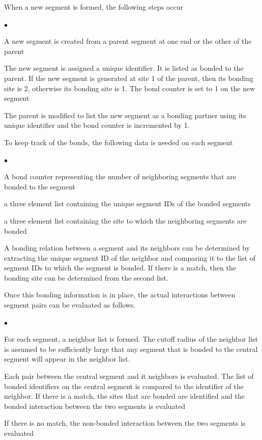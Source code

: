 \documentclass[12pt]{article}
\begin{document}
When a new segment is formed, the following steps occur
\begin{list}{$\bullet$}{}
\item A new segment is created from a parent segment at one end or the other of
the parent
\item The new segment is assigned a unique identifier. It is listed as bonded to
the parent. If the new segment is generated at site 1 of the parent, then its
bonding site is 2, otherwise its bonding site is 1. The bond counter is set to 1
on the new segment
\item The parent is modified to list the new segment as a bonding partner using
its unique identifier and the bond counter is incremented by 1.
\end{list}

To keep track of the bonds, the following data is needed on each segment
\begin{list}{$\bullet$}{}
\item A bond counter representing the number of neighboring segments that are bonded
to the segment
\item a three element list containing the unique segment IDs of the bonded
segments
\item a three element list containing the site to which the neighboring segments
are bonded
\end{list}
A bonding relation between a segment and its neighbors can be determined by
extracting the unique segment ID of the neighbor and comparing it to the list 
of segment IDs to which the segment is bonded. If there is a match, then the bonding
site can be determined from the second list.

Once this bonding information is in place, the actual interactions between segment
pairs can be evaluated as follows.
\begin{list}{$\bullet$}{}
\item For each segment, a neighbor list is formed. The cutoff radius of the
neighbor list is assumed to be sufficiently large that any segment that is bonded
to the central segment will appear in the neighbor list.
\item Each pair between the central segment and it neighbors is evaluated. The
list of bonded identifiers on the central segment is compared to the identifier
of the neighbor. If there is a match, the sites that are bonded are identified and
the bonded interaction between the two segments is evaluated
\item If there is no match, the non-bonded interaction between the two segments is
evaluated
\end{list}


\end{document}

